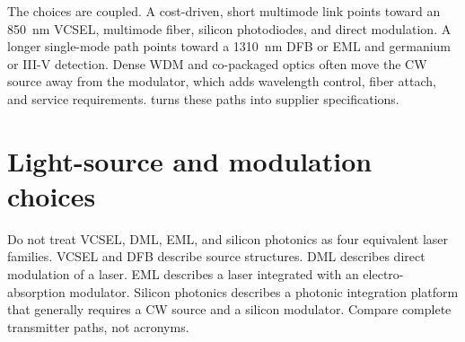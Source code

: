 The choices are coupled. A cost-driven, short multimode link points toward an
850~nm VCSEL, multimode fiber, silicon photodiodes, and direct modulation. A
longer single-mode path points toward a 1310~nm DFB or EML and germanium or
III-V detection. Dense WDM and co-packaged optics often move the CW source away
from the modulator, which adds wavelength control, fiber attach, and service
requirements.  turns these paths into
supplier specifications.

\section{Light-source and modulation choices}

Do not treat VCSEL, DML, EML, and silicon photonics as four equivalent laser
families. VCSEL and DFB describe source structures. DML describes direct
modulation of a laser. EML describes a laser integrated with an
electro-absorption modulator. Silicon photonics describes a photonic integration
platform that generally requires a CW source and a silicon modulator. Compare
complete transmitter paths, not acronyms.


